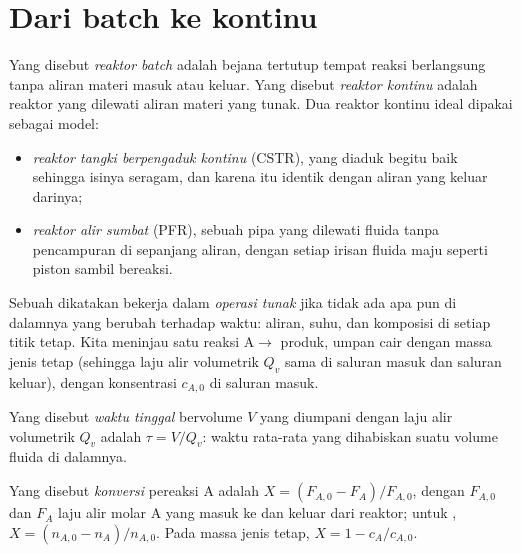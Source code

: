 \section{Dari batch ke kontinu}

\begin{definition}\label{def:b2:continuous-reactors:reactors}
Yang disebut \emph{reaktor batch} adalah bejana
tertutup tempat reaksi berlangsung tanpa aliran materi masuk atau keluar.
Yang disebut \emph{reaktor kontinu} adalah reaktor
yang dilewati aliran materi yang tunak. Dua reaktor kontinu ideal dipakai
sebagai model:
\begin{itemize}
  \item \emph{reaktor tangki berpengaduk kontinu}
 (CSTR), yang diaduk begitu baik sehingga isinya
        seragam, dan karena itu identik dengan aliran yang keluar darinya;
  \item \emph{reaktor alir sumbat} (PFR), sebuah
        pipa yang dilewati fluida tanpa pencampuran di sepanjang aliran,
        dengan setiap irisan fluida maju seperti piston sambil bereaksi.
\end{itemize}
\end{definition}

Sebuah  dikatakan bekerja dalam \emph{operasi tunak} jika
tidak ada apa pun di dalamnya yang berubah terhadap waktu: aliran, suhu,
dan komposisi di setiap titik tetap. Kita meninjau satu reaksi
$\mathrm A \to$ produk, umpan cair dengan massa jenis tetap (sehingga laju
alir volumetrik $Q_v$ sama di saluran masuk dan saluran keluar), dengan
konsentrasi $c_{A,0}$ di saluran masuk.

\begin{definition}\label{def:b2:continuous-reactors:residence-time}
Yang disebut \emph{waktu tinggal} 
bervolume $V$ yang diumpani dengan laju alir volumetrik $Q_v$ adalah
$\tau = V/Q_v$: waktu rata-rata yang dihabiskan suatu volume fluida di
dalamnya.
\end{definition}

\begin{definition}[Konversi]\label{def:b2:continuous-reactors:conversion}
Yang disebut \emph{konversi} pereaksi A adalah
$X = (F_{A,0} -
F_A)/F_{A,0}$, dengan $F_{A,0}$ dan $F_A$ laju alir molar A
yang masuk ke dan keluar dari reaktor; untuk ,
$X = (n_{A,0} -
n_A)/n_{A,0}$. Pada massa jenis tetap,
$X = 1 - c_A/c_{A,0}$.
\end{definition}

